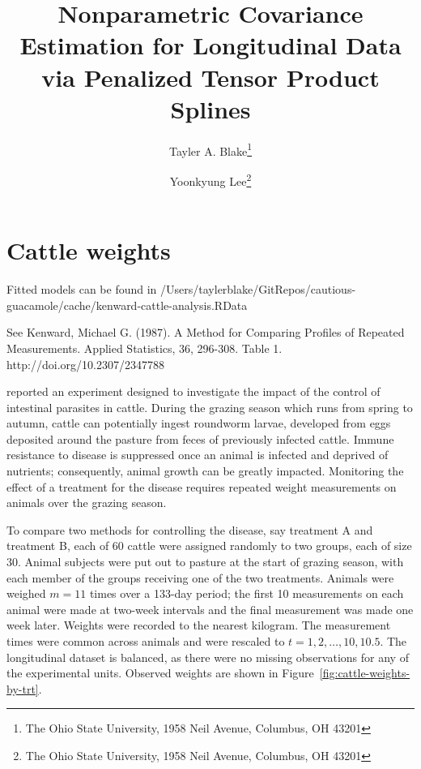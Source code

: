 \documentclass[12pt]{article}
\theoremstyle{definition}
\def\bL{\mathbf{L}}
\begin{document}
\def\bL{\mathbf{L}}



\title{ Nonparametric Covariance Estimation for Longitudinal Data via Penalized Tensor Product Splines}

\author{Tayler A. Blake\thanks{The Ohio State University, 1958 Neil Avenue, Columbus, OH 43201} \and  Yoonkyung Lee\thanks{The Ohio State University, 1958 Neil Avenue, Columbus, OH 43201}}


\maketitle

\section{Cattle weights}

Fitted models can be found in 
/Users/taylerblake/GitRepos/cautious-guacamole/cache/kenward-cattle-analysis.RData

See Kenward, Michael G. (1987). A Method for Comparing Profiles of Repeated Measurements. Applied Statistics, 36, 296-308. Table 1. http://doi.org/10.2307/2347788

\bigskip

\citet{kenward1987method} reported an experiment designed to investigate the impact of the control of intestinal parasites in cattle. During the grazing season which runs from spring to autumn, cattle can potentially ingest roundworm larvae, developed from eggs deposited around the pasture from feces of previously infected cattle. Immune resistance to disease is suppressed once an animal is infected and deprived of nutrients; consequently, animal growth can be greatly impacted. Monitoring the effect of a treatment for the disease requires repeated weight measurements on animals over the grazing season. 

\bigskip

To compare two methods for controlling the disease, say treatment A and treatment B, each of 60 cattle were assigned randomly to two groups, each of size 30. Animal subjects were put out to pasture at the start of grazing season, with each member of the groups receiving one of the two treatments. Animals were weighed $m = 11$ times over a 133-day period; the first 10 measurements on each animal were made at two-week intervals and the final measurement was made one week later. Weights were recorded to the nearest kilogram. The measurement times were common across animals and were rescaled to $t = 1, 2, \dots, 10, 10.5$. The longitudinal dataset is balanced, as there were no missing observations for any of the experimental units. Observed weights are shown in Figure~\ref{fig:cattle-weights-by-trt}.
  
\end{document}
